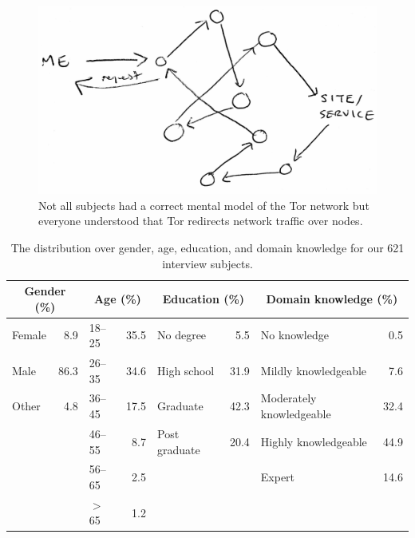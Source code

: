 \begin{figure}
\centering
\includegraphics[width=\linewidth]{figures/p08-sketch.pdf}
\caption{Not all subjects had a correct mental model of the Tor network but
everyone understood that Tor redirects network traffic over nodes.}
\label{fig:p11-sketch}
\end{figure}

\begin{table}[ht]
	\centering
	\begin{tabular}{l r l r l r l r}
	\toprule
	\multicolumn{2}{c}{Gender (\%)} &
	\multicolumn{2}{c}{Age (\%)} &
	\multicolumn{2}{c}{Education (\%)} &
	\multicolumn{2}{c}{Domain knowledge (\%)} \\
	\midrule
	Female & 8.9  & 18--25   & 35.5 & No degree     & 5.5  & No knowledge             & 0.5  \\
	Male   & 86.3 & 26--35   & 34.6 & High school   & 31.9 & Mildly knowledgeable     & 7.6  \\
	Other  & 4.8  & 36--45   & 17.5 & Graduate      & 42.3 & Moderately knowledgeable & 32.4 \\
	       &      & 46--55   & 8.7  & Post graduate & 20.4 & Highly knowledgeable     & 44.9 \\
	       &      & 56--65   & 2.5  &               &      & Expert                   & 14.6 \\
	       &      & $>$ 65   & 1.2  &               &      & & \\
	\bottomrule
	\end{tabular}
	\caption{The distribution over gender, age, education, and domain knowledge 
	for our 621 interview subjects.}
	\label{tab:survey-demo}
\end{table}

